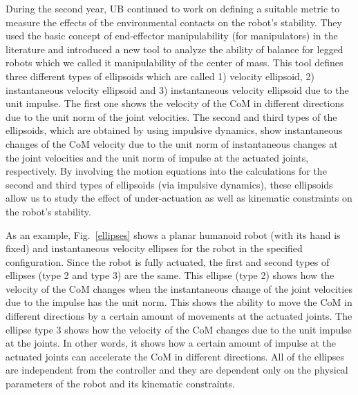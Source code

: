 During the second year, UB continued to work on defining a suitable metric to
measure the effects of the environmental contacts on the robot's stability.
They used the basic concept of end-effector manipulability (for manipulators)
in the literature and introduced a new tool to analyze the ability of balance
for legged robots which we called it manipulability of the center of mass.
This tool defines three different types of ellipsoids which are called 1)
velocity ellipsoid, 2) instantaneous velocity ellipsoid and 3) instantaneous
velocity ellipsoid due to the unit impulse.  The first one shows the velocity
of the CoM in different directions due to the unit norm of the joint
velocities.  The second and third types of the ellipsoids, which are obtained
by using impulsive dynamics, show instantaneous changes of the CoM velocity
due to the unit norm of instantaneous changes at the joint velocities and the
unit norm of impulse at the actuated joints, respectively.  By involving the
motion equations into the calculations for the second and third types of
ellipsoids (via impulsive dynamics), these ellipsoids allow us to study the
effect of under-actuation as well as kinematic constraints on the robot's
stability.

As an example, Fig.~\ref{ellipses} shows a planar humanoid robot (with its hand 
is fixed) and instantaneous velocity ellipses for the robot in the
specified configuration. Since the robot is fully actuated, the first and
second types of ellipses (type 2 and type 3) are the same. This ellipse (type
2) shows how the velocity of the CoM changes when the instantaneous change of
the joint velocities due to the impulse has the unit norm. This shows the
ability to move the CoM in different directions by a certain amount of
movements at the actuated joints. The ellipse type 3 shows how the velocity
of the CoM changes due to the unit impulse at the joints. In other words, it
shows how a certain amount of impulse at the actuated joints can accelerate
the CoM in different directions. All of the ellipses are independent from the
controller and they are dependent only on the physical parameters of the robot
and its kinematic constraints.

